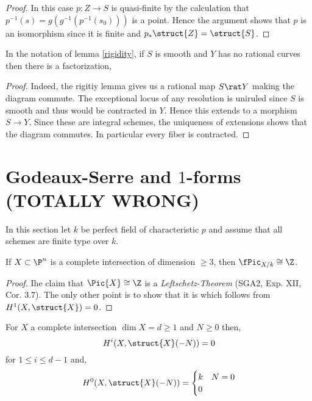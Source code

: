 \documentclass[12pt]{article}
\begin{document}
\begin{proof}
In this case $p : Z \to S$ is quasi-finite by the calculation that $p^{-1}(s) = g(g^{-1}(p^{-1}(s_0)))$ is a point. Hence the argument shows that $p$ is an isomorphism since it is finite and $p_* \struct{Z} = \struct{S}$.
\end{proof}

\begin{cor}
In the notation of lemma \ref{rigidity}, if $S$ is smooth and $Y$ has no rational curves then there is a factorization,
\begin{center}
\end{center}
\end{cor}

\begin{proof}
Indeed, the rigitiy lemma gives us a rational map $S \rat Y$ making the diagram commute. The exceptional locus of any resolution is uniruled since $S$ is smooth and thus would be contracted in $Y$. Hence this extends to a morphism $S \to Y$. Since these are integral schemes, the uniqueness of extensions shows that the diagram commutes. In particular every fiber is contracted. 
\end{proof}

\newpage

\section{Godeaux-Serre and $1$-forms (TOTALLY WRONG)}

In this section let $k$ be perfect field of characteristic $p$ and assume that all schemes are finite type over $k$.

\begin{lemma}
If $X \subset \P^n$ is a complete intersection of dimension $\ge 3$, then $\fPic_{X/k} \cong \Z$. 
\end{lemma}

\begin{proof}
Ihe claim that $\Pic{X} \cong \Z$ is a \textit{Leftschetz-Theorem} (SGA2, Exp. XII, Cor. 3.7). The only other point is to show that it is \etale which follows from $H^1(X, \struct{X}) = 0$. 
\end{proof}

\begin{prop}
For $X$ a complete intersection $\dim{X} = d \ge 1$ and $N \ge 0$ then,
\[ H^i(X, \struct{X}(-N)) = 0 \]
for $1 \le i \le d - 1$ and,
\[ H^0(X, \struct{X}(-N)) = 
\begin{cases}
k & N = 0 
\\
0
\end{cases} \]
\end{prop}
\end{document}
